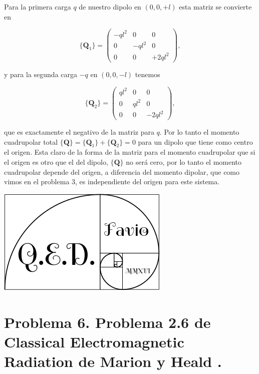 \documentclass[a4paper,11pt]{article}
\numberwithin{equation}{section}
\begin{document}
Para la primera carga $q$ de nuestro dipolo en $(0,0,+l)$ esta matriz se convierte en 

\begin{equation}
 \{ \mathbf{Q}_1 \} = \begin{pmatrix}
                     -ql^2 & 0 & 0 \\
                     0 & -ql^2 & 0 \\
                     0 & 0 & +2ql^2
                    \end{pmatrix},
\end{equation}

y para la segunda carga $-q$ en $(0,0,-l)$ tenemos 

\begin{equation}
 \{ \mathbf{Q}_2 \} = \begin{pmatrix}
                     ql^2 & 0 & 0 \\
                     0 & ql^2 & 0 \\
                     0 & 0 & -2ql^2
                    \end{pmatrix},
\end{equation}

que es exactamente el negativo de la matriz para $q$. Por lo tanto el momento cuadrupolar 
total $\{ \mathbf{Q} \} = \{ \mathbf{Q}_1 \} + \{ \mathbf{Q}_2 \} = 0$ para un dipolo 
que tiene como centro el origen. Esta claro de la forma de la matriz para el momento 
cuadrupolar que si el origen es otro que el del dipolo, $\{ \mathbf{Q} \}$ no será 
cero, por lo tanto el momento cuadrupolar depende del origen, a diferencia del momento 
dipolar, que como vimos en el problema 3, es independiente del origen para este sistema.

\hspace{10cm}\includegraphics[scale=0.25]{logoQED}

\newpage

\section{Problema 6. Problema 2.6 de Classical Electromagnetic Radiation
de Marion y Heald \cite{marion2}.}
\end{document}

